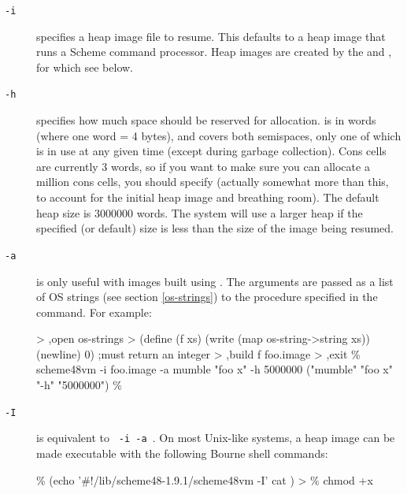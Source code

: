 \begin{description}
\item[{\tt -i} ]
    specifies a heap image file to resume.  This defaults to a heap
    image that runs a Scheme command processor.  Heap images are
    created by the  and , for which see below.

\item[{\tt -h} ]
    specifies how much space should be reserved for allocation.
     is in words (where one word = 4 bytes), and covers both
    semispaces, only one of which is in use at any given time (except
    during garbage collection).  Cons cells are currently 3 words, so
    if you want to make sure you can allocate a million cons cells,
    you should specify  (actually somewhat more than this,
    to account for the initial heap image and breathing room).
    The default heap size is 3000000 words.  The system will use a
    larger heap if the specified (or default) size is less than
    the size of the image being resumed.


\item[{\tt -a} ]
    is only useful with images built using .
    The arguments are passed as a list of OS strings (see section
    \ref{os-strings}) to the procedure specified
    in the  command. For example:
\begin{example}
> ,open os-strings
> (define (f xs)
    (write (map os-string->string xs))
    (newline)
    0)                                        ;must return an integer
> ,build f foo.image
> ,exit
\% scheme48vm -i foo.image -a mumble "foo x" -h 5000000
("mumble" "foo x" "-h" "5000000")
\%
\end{example}

\item[{\tt -I}  ]
    is equivalent to {\tt %
      -i  -a }.
    On most Unix-like systems, a heap image can be made executable with the
    following Bourne shell commands:
\begin{example}
\% (echo '\#!/lib/scheme48-1.9.1/scheme48vm -I'
   cat ) >
\% chmod +x 
\end{example}
\end{description}

